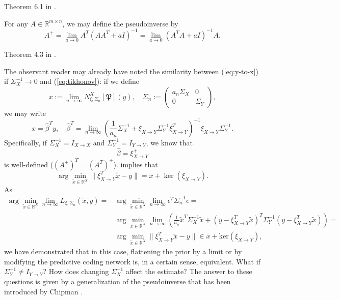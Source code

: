 \documentclass[a4paper,11pt]{report}
\begin{document}
\begin{Bew}
Theorem 6.1 in \cite{Barata2012}.
\end{Bew}

\begin{The}\label{the:tikhonov}
For any $A\in\mathbb{R}^{m\times n}$, we may define the pseudoinverse by
\begin{equation}\label{eq:tikhonov}
A^+=\lim_{a\to 0}A^T(AA^T+aI)^{-1}=\lim_{a\to 0}(A^TA+aI)^{-1}A.
\end{equation}
\end{The}

\begin{Bew}
Theorem 4.3 in \cite{Barata2012}.
\end{Bew}

\begin{Par}\label{prethe:flat}
The observant reader may already have noted the similarity between (\ref{eq:y-to-x}) if $\Sigma_X^{-1}\to 0$ and (\ref{eq:tikhonov}): if we define 
\begin{equation}\label{eq:flat-sigma}
x:=\lim_{n\to\infty}N^X_{\xi,\Sigma_n}[\mathfrak{P}](y), \quad
\Sigma_n:=\begin{pmatrix}
a_n\Sigma_X&0\\
0&\Sigma_Y
\end{pmatrix},
\end{equation}
we may write
\begin{equation}\label{eq:flat-beta}
x=\hat{\beta}^Ty,
\quad
\hat{\beta}^T=\lim_{n\to\infty}\left(\frac{1}{a_n}\Sigma_X^{-1}+\xi_{X\to Y}\Sigma_Y^{-1}\xi_{X\to Y}^T\right)^{-1}\xi_{X\to Y}\Sigma_Y^{-1}.
\end{equation}
Specifically, if $\Sigma_X^{-1}=I_{X\to X}$ and $\Sigma_Y^{-1}=I_{Y\to Y}$, we know that
\[
\hat{\beta}=\xi_{X\to Y}^+
\]
is well-defined ($\left(A^+\right)^T=\left(A^T\right)^+$).  implies that 
\[
\arg\min_{\tilde{x}\in\mathbb{R}^X}\|\xi_{X\to Y}^T\tilde{x}-y\|=
x+\ker\left(\xi_{X\to Y}\right).
\]
As
\begin{align*}
\arg\min_{\tilde{x}\in\mathbb{R}^X}\lim_{n\to\infty}L_{\xi,\Sigma_n}(\tilde{x},y)=&\arg\min_{\tilde{x}\in\mathbb{R}^X}\lim_{n\to\infty}\epsilon^T\Sigma_n^{-1}\epsilon=\\&\arg\min_{\tilde{x}\in\mathbb{R}^X}\lim_{n\to\infty}\left(\frac{1}{a_n}\tilde{x}^T\Sigma_X^{-1}\tilde{x}+(y-\xi_{X\to Y}^T\tilde{x})^T\Sigma_Y^{-1}(y-\xi_{X\to Y}^T\tilde{x})\right)=\\&\arg\min_{\tilde{x}\in\mathbb{R}^X}\|\xi_{X\to Y}^T\tilde{x}-y\|\in x+\text{ker}(\xi_{X\to Y}),
\end{align*}
we have demonstrated that in this case, flattening the prior by a limit or by modifying the predictive coding network is, in a certain sense, equivalent. What if $\Sigma_Y^{-1}\ne I_{Y\to Y}$? How does changing $\Sigma_X^{-1}$ affect the estimate? The answer to these questions is given by a generalization of the pseudoinverse that has been introduced by Chipman \cite{Chipman1964}.
\end{Par}
\end{document}
